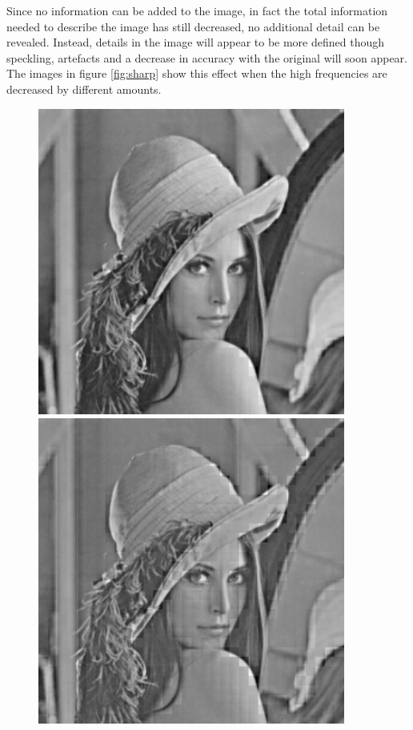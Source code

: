 		Since no information can be added to the image, in fact the total information needed to describe the image has still decreased, no additional detail can be revealed. Instead, details in the image will appear to be more defined though speckling, artefacts and a decrease in accuracy with the original will soon appear. The images in figure \ref{fig:sharp} show this effect when the high frequencies are decreased by different amounts.
		\begin{figure}[ht]
			\centering
			\begin{minipage}[c]{0.3\linewidth}
				\centering
			 	\includegraphics[width=0.9\textwidth]{lena_sharp1.jpg}
			\end{minipage}
			\begin{minipage}[c]{0.3\linewidth}
				\centering
			 	\includegraphics[width=0.9\textwidth]{lena_sharp2.jpg}

\end{minipage}
\end{figure}
